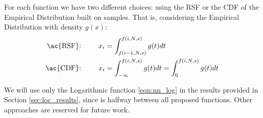 For each function we have two different choices: using the \ac{RSF} or the \ac{CDF} of the Empirical Distribution built on samples. That is, considering the Empirical Distribution with density $g(x)$:
\begin{subequations}
	\begin{align}
		\text{\ac{RSF}: } \quad \quad x_i &= \int_{f(i - 1, N, s)}^{f(i, N, s)} g(t) dt \\
		\text{\ac{CDF}: } \quad \quad x_i &= \int_{-\infty}^{f(i, N, s)} g(t) dt = \int_{0}^{f(i, N, s)} g(t) dt
	\end{align}
\end{subequations}

We will use only the Logarithmic function \eqref{eqn:nn_log} in the results provided in Section \ref{sec:loc_results}, since is halfway between all proposed functions. Other approaches are reserved for future work.
